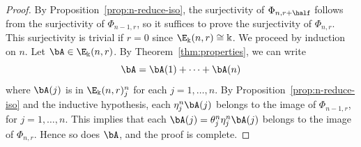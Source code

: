 \begin{proof}
By Proposition~\ref{prop:n-reduce-iso}, the surjectivity of
$\Phi_{n,r+\half}$ follows from the surjectivity of $\Phi_{n-1,r}$, so
it suffices to prove the surjectivity of $\Phi_{n,r}$. This
surjectivity is trivial if $r=0$ since $\E_\Bbbk(n,r) \cong \Bbbk$. We
proceed by induction on $n$. Let $\bA \in \E_\Bbbk(n,r)$. By Theorem~\ref{thm:properties}, we can write
\[
\bA = \bA(1) + \cdots + \bA(n)
\]
where $\bA(j)$ is in $\E_\Bbbk(n,r)^n_j$ for each $j = 1, \dots,
n$. By Proposition~\ref{prop:n-reduce-iso} and the inductive
hypothesis, each $\eta^n_j \bA(j)$ belongs to the image of
$\Phi_{n-1,r}$, for $j = 1, \dots, n$. This implies that each $\bA(j)
= \theta^n_j \eta^n_j \bA(j)$ belongs to the image of
$\Phi_{n,r}$. Hence so does $\bA$, and the proof is complete.
\end{proof}
